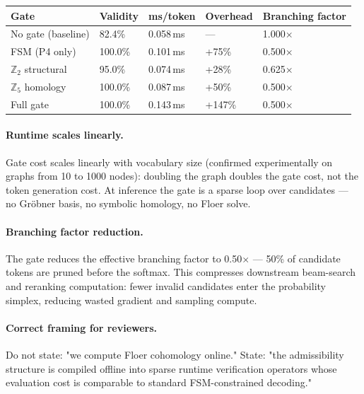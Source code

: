 \documentclass[11pt,a4paper]{article}
\begin{document}
\begin{center}
\renewcommand{\arraystretch}{1.3}\small
\begin{tabularx}{\linewidth}{p{3.0cm}p{1.8cm}p{2.0cm}p{2.0cm}X}
\toprule
\textbf{Gate} & \textbf{Validity} & \textbf{ms/token} & \textbf{Overhead} &
\textbf{Branching factor} \\
\midrule
No gate (baseline)  & 82.4\% & 0.058\,ms & --- & 1.000$\times$ \\
FSM (P4 only)       & 100.0\% & 0.101\,ms & +75\% & 0.500$\times$ \\
$\mathbb{Z}_2$ structural & 95.0\% & 0.074\,ms & +28\% & 0.625$\times$ \\
$\mathbb{Z}_5$ homology   & 100.0\% & 0.087\,ms & +50\% & 0.500$\times$ \\
Full gate           & 100.0\% & 0.143\,ms & +147\% & 0.500$\times$ \\
\bottomrule
\end{tabularx}
\end{center}

\paragraph{Runtime scales linearly.}
Gate cost scales linearly with vocabulary size (confirmed experimentally
on graphs from 10 to 1000 nodes): doubling the graph doubles the gate
cost, not the token generation cost.
At inference the gate is a sparse loop over candidates --- no Gröbner
basis, no symbolic homology, no Floer solve.

\paragraph{Branching factor reduction.}
The gate reduces the effective branching factor to 0.50$\times$ ---
50\% of candidate tokens are pruned before the softmax.
This compresses downstream beam-search and reranking computation:
fewer invalid candidates enter the probability simplex, reducing
wasted gradient and sampling compute.

\paragraph{Correct framing for reviewers.}
Do not state: "we compute Floer cohomology online."
State: "the admissibility structure is compiled offline into sparse
runtime verification operators whose evaluation cost is comparable
to standard FSM-constrained decoding."
\end{document}
